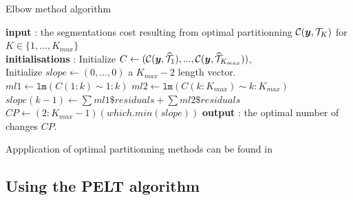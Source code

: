 \begin{algorithm}[ht]
\caption{Elbow method algorithm}\label{chp:3:algoelbow}
\begin{algorithmic}

\State \textbf{input} : the segmentations cost resulting from optimal partitionning ${\mathcal C}(\bm y, {\mathcal T}_{K})$ for $K \in \{1,...,K_{max}\}$ \\

\State \textbf{initialisations} : Initialize $C \gets ({\mathcal C}(\bm y, \widehat{{\mathcal T}}_{1}),...,{\mathcal C}(\bm y, \widehat{{\mathcal T}}_{K_{max}}))$, \\
Initialize $slope \gets (0,...,0)$  a $K_{max}-2$ length vector. 
  \State $ml1 \gets \texttt{lm}(C(1:k) \sim 1:k)$
  \State $ml2 \gets \texttt{lm}(C(k:K_{max}) \sim k:K_{max})$
  \State $slope(k-1) \gets \sum ml1\$ residuals + \sum ml2\$ residuals$
\EndFor
\State $CP \gets (2:K_{max}-1)(which.min(slope))$
\State \textbf{output} : the optimal number of changes $CP$. 
 
\end{algorithmic}
\end{algorithm} 

Appplication of optimal partitionning methods can be found in \cite{rigaill2015pruned,Lavielle1997,perron2006dealing}

\subsection{Using the PELT algorithm}\label{chp:3:2:2}

